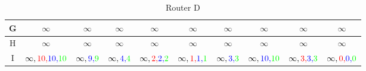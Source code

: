 \documentclass[a4paper,10pt]{article}
\begin{document}
\begin{table}[H]
\begin{tabular}{|c|c|c|c|c|c|c|c|c|c|}
G & $\infty $ & $\infty $ & $ \infty$ & $\infty $ & $\infty $ & $\infty $ & $ \infty$ & $ \infty$ & $\infty $ \\\hline
H & $\infty $ & $\infty $ & $ \infty$ & $\infty $ & $\infty $ & $\infty $ & $ \infty$ & $ \infty$ & $\infty $ \\\hline
I & $ \infty,{\color{red}10,}{\color{blue}10,}{\color{green}10}$ & $\infty,{\color{blue}9,}{\color{green}9} $ & $ \infty,{\color{blue}4,}{\color{green}4}$ & $\infty,{\color{red}2,}{\color{blue}2,}{\color{green}2} $ & $ \infty,{\color{red}1,}{\color{blue}1,}{\color{green}1}$ & $ \infty,{\color{blue}3,}{\color{green}3}$ & $ \infty,{\color{blue}10,}{\color{green}10}$ & $\infty,{\color{red}3,}{\color{blue}3,}{\color{green}3} $ & $ \infty,{\color{red}0,}{\color{blue}0,}{\color{green}0}$ \\\hline
\end{tabular}
\caption{Router D}
\end{table} \\
\end{document}
